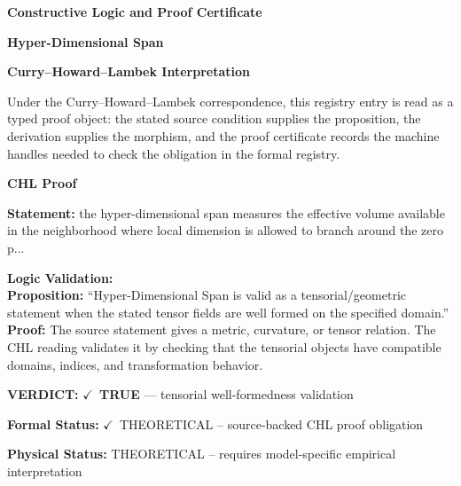 \clearpage
\begingroup\tzpsupportsetup
\noindent\textbf{\fontsize{10.8pt}{12.8pt}\selectfont [ID 0009] Constructive Logic and Proof Certificate}\par
\noindent\textbf{\fontsize{10pt}{12pt}\selectfont Hyper-Dimensional Span}\par
\vspace{0.45em}
\begingroup
\footnotesize
\setlength{\parskip}{0.22em}
\setlength{\parindent}{0pt}
\noindent\textbf{Curry--Howard--Lambek Interpretation}\par
Under the Curry--Howard--Lambek correspondence, this registry entry is read as a typed proof
object: the stated source condition supplies the proposition, the derivation supplies the
morphism, and the proof certificate records the machine handles needed to check the obligation
in the formal registry.

\vspace{0.45em}
\noindent\textbf{CHL Proof}\par
\textbf{Statement:} the hyper-dimensional span measures the effective volume available in the neighborhood
where local dimension is allowed to branch around the zero p...

\textbf{Logic Validation:}\\
\textbf{Proposition:} ``Hyper-Dimensional Span is valid as a tensorial/geometric statement when the stated
tensor fields are well formed on the specified domain.''\\
\textbf{Proof:} The source statement gives a metric, curvature, or tensor relation. The CHL reading
validates it by checking that the tensorial objects have compatible domains, indices,
and transformation behavior.

\textbf{VERDICT:} \ensuremath{\checkmark}\ \textbf{TRUE} --- tensorial well-formedness validation

\textbf{Formal Status:} \ensuremath{\checkmark}\ THEORETICAL -- source-backed CHL proof obligation

\textbf{Physical Status:} THEORETICAL -- requires model-specific empirical interpretation
\par\vspace{0.45em}
\par
\ifTZPDarkEdition
{}
\fi
\endgroup
\endgroup
